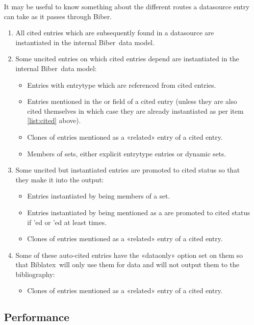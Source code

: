 \documentclass{ltxdockit}
\newcommand*{\biber}{Biber\xspace}
\newcommand*{\biblatex}{Biblatex\xspace}
\begin{document}
It may be useful to know something about the different routes a datasource
entry can take as it passes through \biber.

\begin{enumerate}
\item\label{list:cited} All cited entries which are subsequently found in a
  datasource are instantiated in the internal \biber\ data model.
\item Some uncited entries on which cited entries depend are
  instantiated in the internal \biber\ data model:
  \begin{itemize}
  \item Entries with entrytype  which are referenced from cited
    entries.
  \item Entries mentioned in the  or
     field of a cited entry (unless they are also cited
    themselves in which case they are already instantiated as per item
    \ref{list:cited} above).
      \item Clones of entries mentioned as a «related» entry of a cited
        entry.
      \item Members of sets, either explicit  entrytype entries or
        dynamic sets.
  \end{itemize}
\item Some uncited but instantiated entries are promoted to cited
  status so that they make it into the output:
  \begin{itemize}
  \item Entries instantiated by being members of a set.
  \item Entries instantiated by being mentioned as a  are
    promoted to cited status if 'ed or 'ed at
    least  times.
  \item Clones of entries mentioned as a «related» entry of a cited entry.
  \end{itemize}
\item Some of these auto-cited entries have the «dataonly» option set on
  them so that \biblatex\ will only use them for data and will not output
  them to the bibliography:
  \begin{itemize}
  \item Clones of entries mentioned as a «related» entry of a cited entry.
  \end{itemize}
\end{enumerate}

\subsection{Performance}
\end{document}

